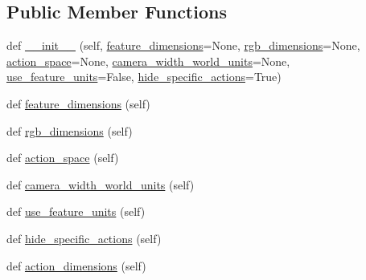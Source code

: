 \subsection*{Public Member Functions}
\begin{DoxyCompactItemize}
\item 
def \mbox{\hyperlink{classpysc2_1_1lib_1_1features_1_1_agent_interface_format_a80c173fac4f02ee090925b0ba2eaa369}{\+\_\+\+\_\+init\+\_\+\+\_\+}} (self, \mbox{\hyperlink{classpysc2_1_1lib_1_1features_1_1_agent_interface_format_afb6336f68b4dd6a550a8483e59d8bf31}{feature\+\_\+dimensions}}=None, \mbox{\hyperlink{classpysc2_1_1lib_1_1features_1_1_agent_interface_format_a5531c5661ecd91f244bf3f9598d22d67}{rgb\+\_\+dimensions}}=None, \mbox{\hyperlink{classpysc2_1_1lib_1_1features_1_1_agent_interface_format_aebb7cd1ed5816051abe21703184cc16a}{action\+\_\+space}}=None, \mbox{\hyperlink{classpysc2_1_1lib_1_1features_1_1_agent_interface_format_a5140a9024f2fb47046074e511acd0dd0}{camera\+\_\+width\+\_\+world\+\_\+units}}=None, \mbox{\hyperlink{classpysc2_1_1lib_1_1features_1_1_agent_interface_format_abac891fe53cafd4798d13ca70db971f5}{use\+\_\+feature\+\_\+units}}=False, \mbox{\hyperlink{classpysc2_1_1lib_1_1features_1_1_agent_interface_format_adbc6be15eae7945c226758c1bc666443}{hide\+\_\+specific\+\_\+actions}}=True)
\item 
def \mbox{\hyperlink{classpysc2_1_1lib_1_1features_1_1_agent_interface_format_afb6336f68b4dd6a550a8483e59d8bf31}{feature\+\_\+dimensions}} (self)
\item 
def \mbox{\hyperlink{classpysc2_1_1lib_1_1features_1_1_agent_interface_format_a5531c5661ecd91f244bf3f9598d22d67}{rgb\+\_\+dimensions}} (self)
\item 
def \mbox{\hyperlink{classpysc2_1_1lib_1_1features_1_1_agent_interface_format_aebb7cd1ed5816051abe21703184cc16a}{action\+\_\+space}} (self)
\item 
def \mbox{\hyperlink{classpysc2_1_1lib_1_1features_1_1_agent_interface_format_a5140a9024f2fb47046074e511acd0dd0}{camera\+\_\+width\+\_\+world\+\_\+units}} (self)
\item 
def \mbox{\hyperlink{classpysc2_1_1lib_1_1features_1_1_agent_interface_format_abac891fe53cafd4798d13ca70db971f5}{use\+\_\+feature\+\_\+units}} (self)
\item 
def \mbox{\hyperlink{classpysc2_1_1lib_1_1features_1_1_agent_interface_format_adbc6be15eae7945c226758c1bc666443}{hide\+\_\+specific\+\_\+actions}} (self)
\item 
def \mbox{\hyperlink{classpysc2_1_1lib_1_1features_1_1_agent_interface_format_a8fa5a036defb7844b94946a505e28148}{action\+\_\+dimensions}} (self)
\end{DoxyCompactItemize}


